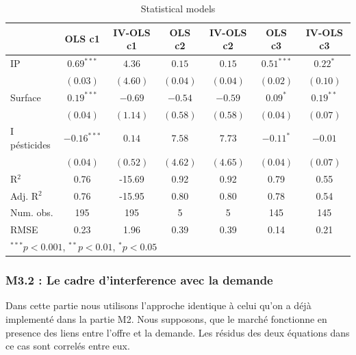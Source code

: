 \documentclass[11pt,]{article}
\begin{document}
\FloatBarrier

\begin{table}[!htbp]
\begin{center}
\begin{tabular}{l c c c c c c }
\hline
 & OLS c1 & IV-OLS c1 & OLS c2 & IV-OLS c2 & OLS c3 & IV-OLS c3 \\
\hline
IP           & $0.69^{***}$  & $4.36$   & $0.15$   & $0.15$   & $0.51^{***}$ & $0.22^{*}$  \\
             & $(0.03)$      & $(4.60)$ & $(0.04)$ & $(0.04)$ & $(0.02)$     & $(0.10)$    \\
Surface      & $0.19^{***}$  & $-0.69$  & $-0.54$  & $-0.59$  & $0.09^{*}$   & $0.19^{**}$ \\
             & $(0.04)$      & $(1.14)$ & $(0.58)$ & $(0.58)$ & $(0.04)$     & $(0.07)$    \\
I pésticides & $-0.16^{***}$ & $0.14$   & $7.58$   & $7.73$   & $-0.11^{*}$  & $-0.01$     \\
             & $(0.04)$      & $(0.52)$ & $(4.62)$ & $(4.65)$ & $(0.04)$     & $(0.07)$    \\
\hline
R$^2$        & 0.76          & -15.69   & 0.92     & 0.92     & 0.79         & 0.55        \\
Adj. R$^2$   & 0.76          & -15.95   & 0.80     & 0.80     & 0.78         & 0.54        \\
Num. obs.    & 195           & 195      & 5        & 5        & 145          & 145         \\
RMSE         & 0.23          & 1.96     & 0.39     & 0.39     & 0.14         & 0.21        \\
\hline
\multicolumn{7}{l}{\scriptsize{$^{***}p<0.001$, $^{**}p<0.01$, $^*p<0.05$}}
\end{tabular}
\caption{Statistical models}
\label{table : ols et ivols clusters}
\end{center}
\end{table}

\FloatBarrier

\hypertarget{m3.2-le-cadre-dinterference-avec-la-demande}{%
\subsubsection{M3.2 : Le cadre d'interference avec la
demande}\label{m3.2-le-cadre-dinterference-avec-la-demande}}

Dans cette partie nous utilisons l'approche identique à celui qu'on a
déjà implementé dans la partie M2. Nous supposons, que le marché
fonctionne en presence des liens entre l'offre et la demande. Les
résidus des deux équations dans ce cas sont correlés entre eux.
\end{document}
